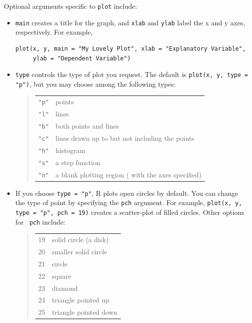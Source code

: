 \documentclass{article}
\begin{document}
Optional arguments specific to \texttt{plot} include:
\begin{itemize}
\item \texttt{main} creates a title for the graph, and \texttt{xlab}
  and \texttt{ylab} label the x and y axes, respectively. For
  example,
\begin{verbatim}
plot(x, y, main = "My Lovely Plot", xlab = "Explanatory Variable", 
     ylab = "Dependent Variable")
\end{verbatim}
  
\item \texttt{type} controls the type of plot you request.  The
  default is \texttt{plot(x, y, type = "p")}, but you may choose among
  the following types:
    \begin{table}[!h]
    \begin{quote}
    \begin{tabular}{cl}
    {\tt "p"} & points\\
    {\tt "l"} & lines\\
    {\tt "b"} & both points and lines\\
    {\tt "c"} & lines drawn up to but not including the points\\
    {\tt "h"} & histogram\\
    {\tt "s"} & a step function\\
    {\tt "n"} & a blank plotting region ( with the axes specified)
    \end{tabular}
    \end{quote}
    \end{table}
\item If you choose {\tt type = "p"}, R plots open circles by default.
  You can change the type of point by specifying the {\tt pch}
  argument.  For example, \texttt{plot(x, y, type = "p", pch = 19)}
  creates a scatter-plot of filled circles.  Other options for {\tt
    pch} include:
    \begin{table}[!h]
    \begin{quote}
    \begin{tabular}{cl}
    19 & solid circle (a disk) \\
    20 & smaller solid circle \\
    21 & circle\\
    22 & square\\
    23 & diamond \\
    24 & triangle pointed up\\
    25 & triangle pointed down\\
    \end{tabular}
    \end{quote}
    \end{table}


\end{itemize}
\end{document}
